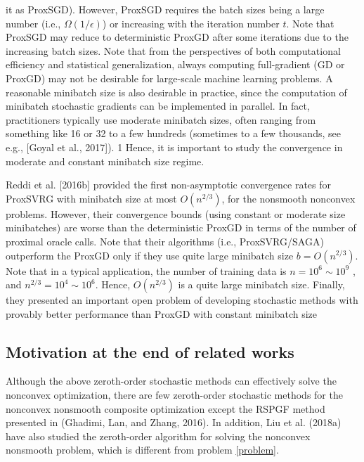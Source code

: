 \documentclass{article}
\theoremstyle{definition}
\theoremstyle{remark}
\begin{document}
{{it as ProxSGD). However, ProxSGD requires the batch sizes being a large number (i.e., $\Omega(1/\epsilon)$) or increasing with
the iteration number $t$. Note that ProxSGD may reduce to deterministic ProxGD after some iterations due to the
increasing batch sizes. Note that from the perspectives of both computational efficiency and statistical generalization,
always computing full-gradient (GD or ProxGD) may not be desirable for large-scale machine learning problems. A reasonable minibatch size is also desirable in practice, since the computation of minibatch stochastic gradients can be
implemented in parallel. In fact, practitioners typically use moderate minibatch sizes, often ranging from something
like 16 or 32 to a few hundreds (sometimes to a few thousands, see e.g., [Goyal et al., 2017]). 1 Hence, it is important
to study the convergence in moderate and constant minibatch size regime.

Reddi et al. [2016b] provided the first non-asymptotic convergence rates for ProxSVRG with minibatch size at most $O(n^{2/3})$, for the nonsmooth nonconvex problems. However, their convergence bounds (using constant or moderate
size minibatches) are worse than the deterministic ProxGD in terms of the number of proximal oracle calls. Note that their algorithms (i.e., ProxSVRG/SAGA) outperform the ProxGD only if they use quite large minibatch size
$b = O(n^{2/3})$. Note that in a typical application, the number of training data is $n = 10^6 \sim 10^9$ , and $n^{2/3} = 10^4 \sim 10^6$.
Hence, $O(n^{2/3})$ is a quite large minibatch size. Finally, they presented an important open problem of developing
stochastic methods with provably better performance than ProxGD with constant minibatch size
}
\subsection{Motivation at the end of related works}
Although the above zeroth-order stochastic methods can effectively solve the nonconvex optimization, there are few zeroth-order stochastic methods for the nonconvex nonsmooth composite optimization except the RSPGF method presented in (Ghadimi, Lan, and Zhang, 2016). In addition, Liu et al. (2018a) have also studied the zeroth-order algorithm for solving the nonconvex nonsmooth problem, which is different from problem \eqref{problem}.
}
\end{document}
